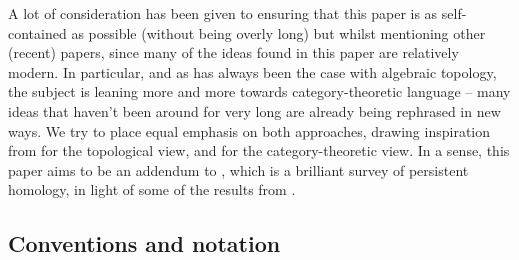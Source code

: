 \documentclass[12pt]{article}
\numberwithin{equation}{subsection}
\numberwithin{theorem}{subsection}
\numberwithin{lemma}{subsection}
\numberwithin{corollary}{subsection}
\numberwithin{definition}{subsection}
\numberwithin{example}{subsection}
\numberwithin{note}{subsection}
\begin{document}
        A lot of consideration has been given to ensuring that this paper is as self-contained as possible (without being overly long) but whilst mentioning other (recent) papers, since many of the ideas found in this paper are relatively modern.
        In particular, and as has always been the case with algebraic topology, the subject is leaning more and more towards category-theoretic language -- many ideas that haven't been around for very long are already being rephrased in new ways.
        We try to place equal emphasis on both approaches, drawing inspiration from \cite{CohenSteiner:2009ho} for the topological view, and \cite{Bubenik:dn} for the category-theoretic view.
        In a sense, this paper aims to be an addendum to \cite{Edelsbrunner:2008gf}, which is a brilliant survey of persistent homology, in light of some of the results from \cite{Bubenik:dn}.



        \subsection{Conventions and notation} %
        \label{sub:conventions}
\end{document}
